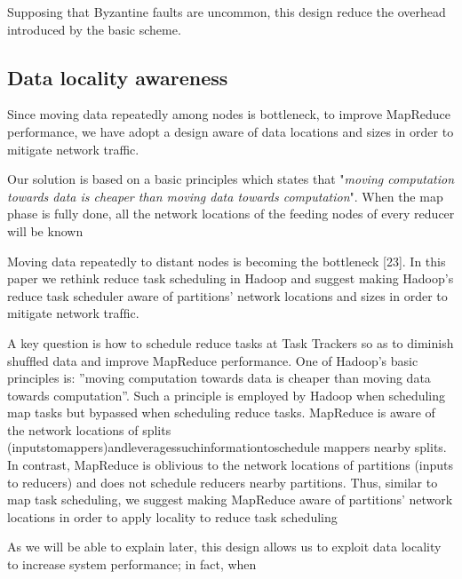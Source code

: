 \documentclass[sigchi]{acmart}
\begin{document}
Supposing that Byzantine faults are uncommon, this design reduce the overhead introduced by the basic scheme.

\subsection{Data locality awareness}

Since moving data repeatedly among nodes is bottleneck, to improve MapReduce performance, we have adopt a design aware of data locations and sizes in order to mitigate network traffic.

Our solution is based on a basic principles which states that "\textit{moving computation towards data is cheaper than moving data towards computation}". When the map phase is fully done, all the network locations of the feeding nodes of every reducer will be known


Moving data repeatedly to distant nodes is becoming the bottleneck [23]. In this paper we rethink reduce task scheduling in Hadoop and suggest making Hadoop’s reduce task scheduler aware of partitions’ network locations and sizes in order to mitigate network trafﬁc. 

A key question is how to schedule reduce tasks at Task Trackers so as to diminish shufﬂed data and improve MapReduce performance. One of Hadoop’s basic principles is: ”moving computation towards data is cheaper than moving data towards computation”. Such a principle is employed by Hadoop when scheduling map tasks but bypassed when scheduling reduce tasks. MapReduce is aware of the network locations of splits (inputstomappers)andleveragessuchinformationtoschedule mappers nearby splits. In contrast, MapReduce is oblivious to the network locations of partitions (inputs to reducers) and does not schedule reducers nearby partitions. Thus, similar to map task scheduling, we suggest making MapReduce aware of partitions’ network locations in order to apply locality to reduce task scheduling



As we will be able to explain later, this design allows us to exploit data locality to increase system performance; in fact, when 
\end{document}
